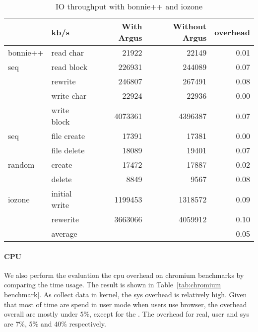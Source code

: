 \begin{table}[h]
\footnotesize
\centering
\begin{tabular}{ll|rrr}
\hline
 & kb/s & With Argus & Without Argus & overhead\\
 \hline
bonnie++ &read char & 21922 & 22149 & 0.01\\
 seq& read block & 226931 & 244089 & 0.07\\
 & rewrite & 246807 & 267491 & 0.08\\
 & write char & 22924 & 22936 & 0.00\\
 & write block & 4073361 & 4396387 & 0.07\\
 seq& file create & 17391 & 17381 & 0.00\\
 & file delete & 18089 & 19401 & 0.07\\
 random& create & 17472 & 17887 & 0.02\\
 & delete & 8849 & 9567 & 0.08\\
iozone & initial write & 1199453 & 1318572 & 0.09\\
 & rewerite & 3663066 & 4059912 & 0.10\\
 \hline
 & average & & & 0.05\\
 \hline
\end{tabular}
\caption{IO throughput with bonnie++ and iozone}
\label{tab:iothroughput}
\end{table}


\paragraph{CPU}

We also perform the evaluation the cpu overhead on chromium benchmarks by
comparing the time usage. The result is shown in Table~\ref{tab:chromium
benchmark}. As \xxx collect data in kernel, the sys overhead is relatively
high. Given that most of time are spend in user mode when users use
browser, the overhead overall are mostly under 5\%, except for the
. The overhead for real, user and sys are 7\%,
5\% and 40\% respectively.

